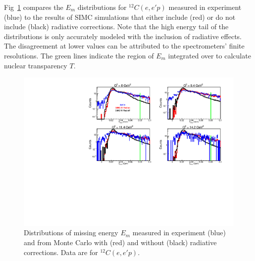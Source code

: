 Fig~\ref{fig:Emiss_data_simc_w_and_wo_radcor} compares the $E_m$ distributions
for ${}^{12}C(e,e'p)$ measured in experiment (blue) to the results of SIMC
simulations that either include (red) or do not include (black) radiative
corrections.
Note that the high energy tail of the distributions is only accurately modeled
with the inclusion of radiative effects.
The disagreement at lower values can be attributed to the spectrometers' finite
resolutions.
The green lines indicate the region of $E_{m}$ integrated over to calculate
nuclear transparency $T$.

\begin{figure}[!h]
    \centering
    \includegraphics[width=1.0\textwidth]{chap5/Emiss_data_simc_w_and_wo_radcor.pdf}
    \caption{
            Distributions of missing energy $E_m$ measured in experiment (blue)
            and
            from Monte Carlo with (red) and without (black) radiative
            corrections.
            Data are for ${}^{12}C(e,e'p)$.
            }
    \label{fig:Emiss_data_simc_w_and_wo_radcor}
\end{figure}


